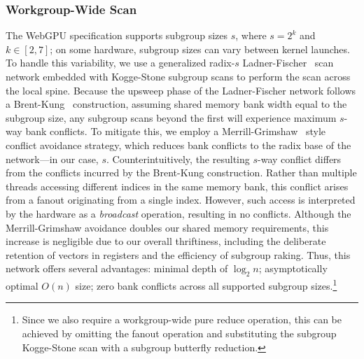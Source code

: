 \documentclass[sigconf]{acmart}
\begin{document}
\subsubsection{Workgroup-Wide Scan}
The WebGPU specification supports subgroup sizes $s$, where $s = 2^k$ and $k \in [2, 7]$; on some hardware, subgroup sizes can vary between kernel launches. To handle this variability, we use a generalized radix-$s$ Ladner-Fischer~\cite{} scan network embedded with Kogge-Stone subgroup scans to perform the scan across the local spine. Because the upsweep phase of the Ladner-Fischer network follows a Brent-Kung~\cite{1675982} construction, assuming shared memory bank width equal to the subgroup size, any subgroup scans beyond the first will experience maximum $s$-way bank conflicts. To mitigate this, we employ a Merrill-Grimshaw~\cite[Section 3.3.5]{Merrill2009} style conflict avoidance strategy, which reduces bank conflicts to the radix base of the network—in our case, $s$. Counterintuitively, the resulting $s$-way conflict differs from the conflicts incurred by the Brent-Kung construction. Rather than multiple threads accessing different indices in the same memory bank, this conflict arises from a fanout originating from a single index. However, such access is interpreted by the hardware as a \emph{broadcast} operation, resulting in no conflicts. Although the Merrill-Grimshaw avoidance doubles our shared memory requirements, this increase is negligible due to our overall thriftiness, including the deliberate retention of vectors in registers and the efficiency of subgroup raking. Thus, this network offers several advantages: minimal depth of $\log_2 n$; asymptotically optimal $O(n)$ size; zero bank conflicts across all supported subgroup sizes.\footnote{Since we also require a workgroup-wide pure reduce operation, this can be achieved by omitting the fanout operation and substituting the subgroup Kogge-Stone scan with a subgroup butterfly reduction.}
\end{document}
